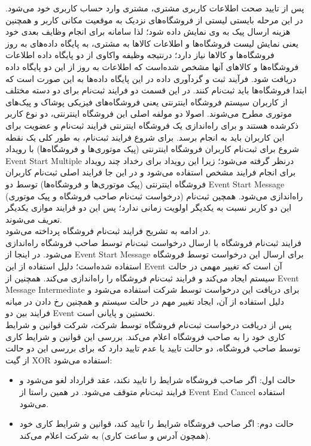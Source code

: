 \documentclass[14pt]{article}
\begin{document}
پس از تایید صحت اطلاعات کاربری مشتری، مشتری وارد حساب کاربری خود می‌شود. در این مرحله بایستی لیستی از فروشگاه‌های نزدیک به موقعیت مکانی کاربر و همچنین هزینه ارسال پیک به وی نمایش داده شود؛ لذا سامانه برای انجام وظایف بعدی خود یعنی نمایش لیست فروشگاه‌ها و اطلاعات کالا‌ها به مشتری، به پایگاه داده‌های به روز فروشگاه‌ها و کالا‌ها نیاز دارد؛ درنتیجه وظیفه واکاوی از دو پایگاه داده اطلاعات فروشگاه‌ها و کالا‌های آنها مشخص شده‌است که اطلاعات به روز از این دو پایگاه داده دریافت شود. فرآیند ثبت و گردآوری داده در این پایگاه داده‌ها به این صورت است که ابتدا فروشگاه‌ها باید ثبت‌نام کنند. در این قسمت دو فرایند ثبت‌نام برای دو دسته مختلف از کاربران سیستم فروشگاه اینترنتی یعنی فروشگاه‌های فیزیکی پوشاک و پیک‌های موتوری مطرح می‌شوند. اصولا دو مولفه اصلی این فروشگاه اینترنتی، دو نوع کاربر ذکرشده هستند و برای راه‌اندازی یک فروشگاه اینترنتی فرایند ثبت‌نام و عضویت برای این کاربران باید به انجام برسد. برای شروع فرایند ثبت‌نام، به طور کلی یک نقطه شروع برای ثبت‌نام کاربران فروشگاه اینترنتی (پیک موتوری‌ها و فروشگاه‌ها) با رویداد Event Start Multiple درنظر گرفته می‌شود؛ زیرا این رویداد برای رخداد چند رویداد برای انجام فرایند مشخص استفاده می‌شود و در این جا فرایند اصلی ثبت‌نام کاربران فروشگاه اینترنتی (پیک موتوری‌ها و فروشگاه‌ها) توسط دو Event Start Message (درخواست ثبت‌نام صاحب فروشگاه و پیک موتوری) راه‌اندازی می‌شود. همچین ثبت‌نام این دو کاربر نسبت به یکدیگر اولویت زمانی ندارد؛ پس این دو فرایند موازی یکدیگر تعریف می‌شوند.\\
در ادامه به تشریح فرایند ثبت‌نام فروشگاه پرداخته می‌شود. \\
فرایند ثبت‌نام فروشگاه با ارسال درخواست ثبت‌نام توسط صاحب فروشگاه راه‌اندازی می‌شود. در اینجا از Event Start Message برای ارسال این درخواست توسط فروشگاه استفاده شده‌است؛ دلیل استفاده از این Event آن است که تغییر مهمی در حالت سیستم ایجاد می‌کند و فرایند ثبت‌نام فروشگاه را راه‌اندازی می‌کند. همچنین از Event Message Intermediate برای دریافت این درخواست توسط شرکت استفاده می‌شود و دلیل استفاده از آن، ایجاد تغییر مهم در حالت سیستم و همچنین رخ دادن در میانه فرایند بین دو Event نخستین و پایانی است.\\
پس از دریافت درخواست ثبت‌نام فروشگاه توسط شرکت، شرکت قوانین و شرایط کاری خود را به صاحب فروشگاه اعلام می‌کند. بررسی این قوانین و شرایط کاری توسط صاحب فروشگاه، دو حالت تایید یا عدم تایید دارد که برای بررسی این دو حالت از گیت XOR استفاده می‌شود:
\begin{flushright}
\begin{itemize}
\item حالت اول: اگر صاحب فروشگاه شرایط را تایید نکند، عقد قرارداد لغو می‌شود و فرایند ثبت‌نام متوقف می‌شود. در همین راستا از Event End Cancel استفاده می‌شود.
\item حالت دوم: اگر صاحب فروشگاه شرایط را تایید کند، قوانین و شرایط کاری خود (همچون آدرس و ساعت کاری) به شرکت اعلام می‌کند. 
\end{itemize}
\end{flushright}
\end{document}
